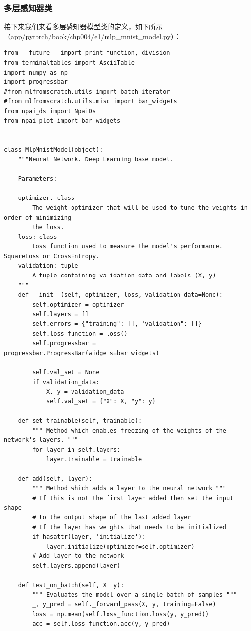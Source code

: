 \documentclass[UTF8]{article}
\begin{document}
\subsubsection{多层感知器类}
接下来我们来看多层感知器模型类的定义，如下所示（app/pytorch/book/chp004/e1/mlp\_mnist\_model.py）：
\begin{lstlisting}
from __future__ import print_function, division
from terminaltables import AsciiTable
import numpy as np
import progressbar
#from mlfromscratch.utils import batch_iterator
#from mlfromscratch.utils.misc import bar_widgets
from npai_ds import NpaiDs
from npai_plot import bar_widgets


class MlpMnistModel(object):
    """Neural Network. Deep Learning base model.

    Parameters:
    -----------
    optimizer: class
        The weight optimizer that will be used to tune the weights in order of minimizing
        the loss.
    loss: class
        Loss function used to measure the model's performance. SquareLoss or CrossEntropy.
    validation: tuple
        A tuple containing validation data and labels (X, y)
    """
    def __init__(self, optimizer, loss, validation_data=None):
        self.optimizer = optimizer
        self.layers = []
        self.errors = {"training": [], "validation": []}
        self.loss_function = loss()
        self.progressbar = progressbar.ProgressBar(widgets=bar_widgets)

        self.val_set = None
        if validation_data:
            X, y = validation_data
            self.val_set = {"X": X, "y": y}

    def set_trainable(self, trainable):
        """ Method which enables freezing of the weights of the network's layers. """
        for layer in self.layers:
            layer.trainable = trainable

    def add(self, layer):
        """ Method which adds a layer to the neural network """
        # If this is not the first layer added then set the input shape
        # to the output shape of the last added layer
        # If the layer has weights that needs to be initialized 
        if hasattr(layer, 'initialize'):
            layer.initialize(optimizer=self.optimizer)
        # Add layer to the network
        self.layers.append(layer)

    def test_on_batch(self, X, y):
        """ Evaluates the model over a single batch of samples """
        _, y_pred = self._forward_pass(X, y, training=False)
        loss = np.mean(self.loss_function.loss(y, y_pred))
        acc = self.loss_function.acc(y, y_pred)


\end{lstlisting}
\end{document}
